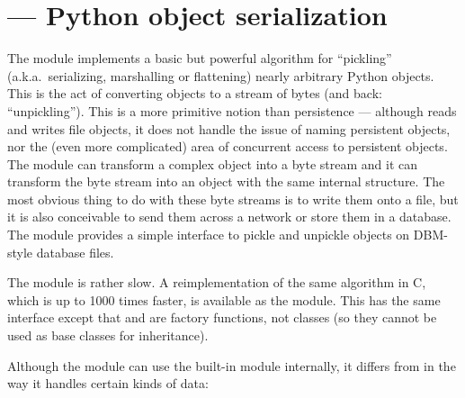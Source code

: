 \section{ ---
         Python object serialization}




The  module implements a basic but powerful algorithm
for ``pickling'' (a.k.a.\ serializing, marshalling or flattening)
nearly arbitrary Python objects.  This is the act of converting
objects to a stream of bytes (and back: ``unpickling'').  This is a
more primitive notion than persistence --- although 
reads and writes file objects, it does not handle the issue of naming
persistent objects, nor the (even more complicated) area of concurrent
access to persistent objects.  The  module can
transform a complex object into a byte stream and it can transform the
byte stream into an object with the same internal structure.  The most
obvious thing to do with these byte streams is to write them onto a
file, but it is also conceivable to send them across a network or
store them in a database.  The module
 provides a simple interface
to pickle and unpickle objects on DBM-style database files.


 The  module is rather slow.  A
reimplementation of the same algorithm in C, which is up to 1000 times
faster, is available as the
 module.  This has the same
interface except that  and  are
factory functions, not classes (so they cannot be used as base classes
for inheritance).

Although the  module can use the built-in module
 internally, it differs from 
 in the way it handles certain kinds of data:

